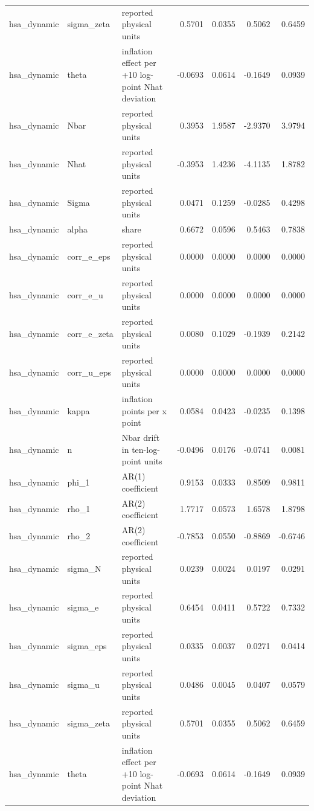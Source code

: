 \begin{tabular}{lllrrrr}
hsa\_dynamic & sigma\_zeta & reported physical units & 0.5701 & 0.0355 & 0.5062 & 0.6459 \\
hsa\_dynamic & theta & inflation effect per +10 log-point Nhat deviation & -0.0693 & 0.0614 & -0.1649 & 0.0939 \\
hsa\_dynamic & Nbar & reported physical units & 0.3953 & 1.9587 & -2.9370 & 3.9794 \\
hsa\_dynamic & Nhat & reported physical units & -0.3953 & 1.4236 & -4.1135 & 1.8782 \\
hsa\_dynamic & Sigma & reported physical units & 0.0471 & 0.1259 & -0.0285 & 0.4298 \\
hsa\_dynamic & alpha & share & 0.6672 & 0.0596 & 0.5463 & 0.7838 \\
hsa\_dynamic & corr\_e\_eps & reported physical units & 0.0000 & 0.0000 & 0.0000 & 0.0000 \\
hsa\_dynamic & corr\_e\_u & reported physical units & 0.0000 & 0.0000 & 0.0000 & 0.0000 \\
hsa\_dynamic & corr\_e\_zeta & reported physical units & 0.0080 & 0.1029 & -0.1939 & 0.2142 \\
hsa\_dynamic & corr\_u\_eps & reported physical units & 0.0000 & 0.0000 & 0.0000 & 0.0000 \\
hsa\_dynamic & kappa & inflation points per x point & 0.0584 & 0.0423 & -0.0235 & 0.1398 \\
hsa\_dynamic & n & Nbar drift in ten-log-point units & -0.0496 & 0.0176 & -0.0741 & 0.0081 \\
hsa\_dynamic & phi\_1 & AR(1) coefficient & 0.9153 & 0.0333 & 0.8509 & 0.9811 \\
hsa\_dynamic & rho\_1 & AR(2) coefficient & 1.7717 & 0.0573 & 1.6578 & 1.8798 \\
hsa\_dynamic & rho\_2 & AR(2) coefficient & -0.7853 & 0.0550 & -0.8869 & -0.6746 \\
hsa\_dynamic & sigma\_N & reported physical units & 0.0239 & 0.0024 & 0.0197 & 0.0291 \\
hsa\_dynamic & sigma\_e & reported physical units & 0.6454 & 0.0411 & 0.5722 & 0.7332 \\
hsa\_dynamic & sigma\_eps & reported physical units & 0.0335 & 0.0037 & 0.0271 & 0.0414 \\
hsa\_dynamic & sigma\_u & reported physical units & 0.0486 & 0.0045 & 0.0407 & 0.0579 \\
hsa\_dynamic & sigma\_zeta & reported physical units & 0.5701 & 0.0355 & 0.5062 & 0.6459 \\
hsa\_dynamic & theta & inflation effect per +10 log-point Nhat deviation & -0.0693 & 0.0614 & -0.1649 & 0.0939 \\

\end{tabular}
